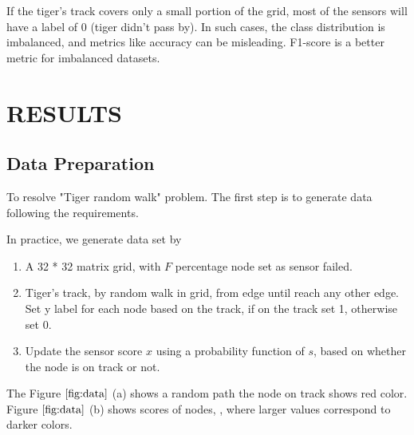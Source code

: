 \documentclass{article}
\begin{document}
If the tiger's track covers only a small portion of the grid, most of the sensors will have a label of 0 (tiger didn't pass by). In such cases, the class distribution is imbalanced, and metrics like accuracy can be misleading. F1-score is a better metric for imbalanced datasets.

\section{RESULTS}
\label{sec:results}

\subsection{Data Preparation}
\label{ssec:data}
To resolve "Tiger random walk" problem. 
The first step is to generate data following the requirements.

In practice, we generate data set by

\begin{enumerate}
  \item A 32 * 32 matrix grid, with $F$ percentage node set as sensor failed.
  \item Tiger's track, by random walk in grid, from edge until reach any other edge.
        \\ Set y label for each node based on the track, if on the track set 1, otherwise set 0.
  \item Update the sensor score $x$ using a probability function of $s$, based on whether the node is on track or not.
\end{enumerate}

The Figure $\ref{fig:data}$ (a) shows a random path the node on track shows red color.
Figure $\ref{fig:data}$ (b) shows scores of nodes, , where larger values correspond to darker colors.

\end{document}
